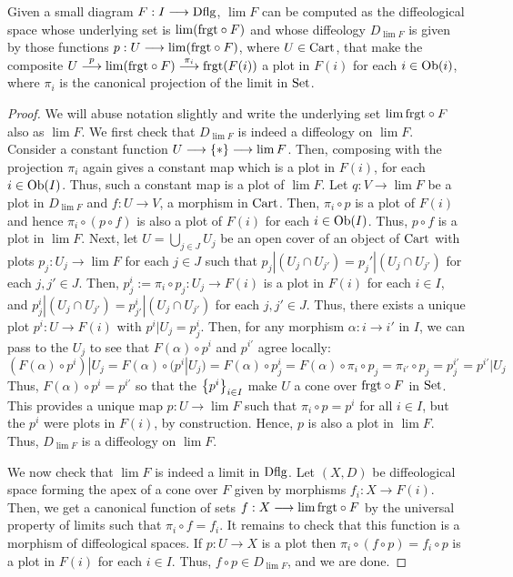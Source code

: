 \documentclass[11pt]{amsart}
\begin{document}
\begin{prop}\label{prop:lim-dflg}
Given a small diagram $F : I \to \Dflg$, $\lim F$ can be computed as the diffeological
space whose underlying set is $\lim (\mathrm{frgt} \circ F)$ and whose diffeology $D_{\lim F}$
is given by those functions $p : U \to \lim (\frgt \circ F)$, where $U \in \mathrm{Cart}$, that make the
composite $U \to[p] \lim (\frgt \circ F) \to[\pi_i] \frgt(F(i))$ a plot in $F(i)$ for each
$i \in \Ob{i}$, where $\pi_i$ is the canonical projection of the limit in $\mathrm{Set}$.
\end{prop}
\begin{proof}
We will abuse notation slightly and write the underlying set $\lim \mathrm{frgt} \circ F$ also as $\lim F$.
We first check that $D_{\lim F}$ is indeed a diffeology on $\lim F$.
Consider a constant function $U \to \set{*} \to \lim F$.
Then, composing with the projection $\pi_i$ again gives a constant map which
is a plot in $F(i)$, for each $i \in \Ob{I}$. Thus, such a constant map is a plot
of $\lim F$.
Let $q : V \to \lim F$ be a plot in $D_{\lim F}$ and $f : U \to V$, a morphism in
$\mathrm{Cart}$. Then, $\pi_i \circ p$ is a plot of $F(i)$ and hence $\pi_i \circ (p \circ f)$ is also a
plot of $F(i)$ for each $i \in \Ob{I}$. Thus, $p \circ f$ is a plot in $\lim F$.
Next, let $U = \bigcup_{j \in J} U_j$ be an open cover of an object of $\mathrm{Cart}$ with
plots $p_j : U_j \to \lim F$ for each $j \in J$ such that
$p_j|(U_j \cap U_{j'}) = p_j'|(U_j \cap U_{j'})$ for each $j, j' \in J$.
Then, $p^i_{j} := \pi_i \circ p_j : U_j \to F(i)$ is a plot in $F(i)$ for each $i \in I$,
and $p^i_{j}|(U_j \cap U_{j'}) = p^i_{j'}|(U_j \cap U_{j'})$ for each $j, j' \in J$.
Thus, there exists a unique plot $p^i : U \to F(i)$ with $p^i|U_j = p^i_{j}$.
Then, for any morphism $\alpha : i \to i'$ in $I$, we can pass to the $U_j$ to see that
$F(\alpha) \circ p^{i}$ and $p^{i'}$ agree locally:
\[
(F(\alpha) \circ p^i)|U_j
= F(\alpha) \circ (p^i|U_j)
= F(\alpha) \circ p^i_j
= F(\alpha) \circ \pi_i \circ p_j
= \pi_{i'} \circ p_j
= p^{i'}_j
= p^{i'}|U_j
\]
Thus, $F(\alpha) \circ p^i = p^{i'}$ so that the $\set{p^i}_{i \in I}$ make $U$ a cone over
$\mathrm{frgt} \circ F$ in $\mathrm{Set}$. This provides a unique map $p : U \to \lim F$ such that
$\pi_i \circ p = p^i$ for all $i \in I$, but the $p^i$ were plots in $F(i)$, by construction.
Hence, $p$ is also a plot in $\lim F$. Thus, $D_{\lim F}$ is a diffeology on $\lim F$.

We now check that $\lim F$ is indeed a limit in $\mathrm{Dflg}$.
Let $(X, D)$ be diffeological space forming the apex of a cone over $F$ given by morphisms
$f_i : X \to F(i)$.
Then, we get a canonical function of sets $f : X \to \lim \frgt \circ F$ by the universal property
of limits such that $\pi_i \circ f = f_i$.
It remains to check that this function is a morphism of diffeological spaces.
If $p : U \to X$ is a plot then $\pi_i \circ (f \circ p) = f_i \circ p$ is a plot in
$F(i)$ for each $i \in I$. Thus, $f \circ p \in D_{\lim F}$, and we are done.
\end{proof}
\end{document}
